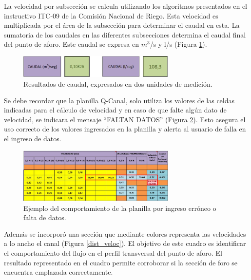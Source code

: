 \documentclass[]{article}
\begin{document}
La velocidad por subsección se calcula utilizando los algoritmos presentados en el instructivo ITC-09 de la Comisión Nacional de Riego. Esta velocidad es multiplicada por el área de la subsección para determinar el caudal en esta. La sumatoria de los caudales en las diferentes subsecciones determina el caudal final del punto de aforo. Este caudal se expresa en $m^3$/s y l/s (Figura \ref{res_q}).\\

\begin{figure}[h]
\centering
\includegraphics[width=0.7\textwidth]{images/caudal.eps}
\caption{Resultados de caudal, expresados en dos unidades de medición.}
\label{res_q}
\end{figure}

Se debe recordar que la planilla Q-Canal, solo utiliza los valores de las celdas indicadas para el cálculo de velocidad y en caso de que falte algún dato de velocidad, se indicara el mensaje “FALTAN DATOS” (Figura \ref{faltan_d}). Esto asegura el uso correcto de los valores ingresados en la planilla y alerta al usuario de falla en el ingreso de datos.\\

\begin{figure}[h]
\centering
\includegraphics[width=0.7\textwidth]{images/faltan_datos.eps}
\caption{Ejemplo del comportamiento de la planilla por ingreso erróneo o falta de datos.}
\label{faltan_d}
\end{figure}

Además se incorporó una sección que mediante colores representa las velocidades a lo ancho el canal (Figura \ref{dist_veloc}). El objetivo de este cuadro es identificar el comportamiento del flujo en el perfil transversal del punto de aforo. El resultado representado en el cuadro permite corroborar si la sección de foro se encuentra emplazada correctamente. 
\end{document}
